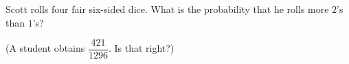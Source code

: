 Scott rolls four fair six-sided dice. What is the probability that he rolls more $2$'s than $1$'s?

(A student obtains $\dfrac{421}{1296}$. Is that right?)
